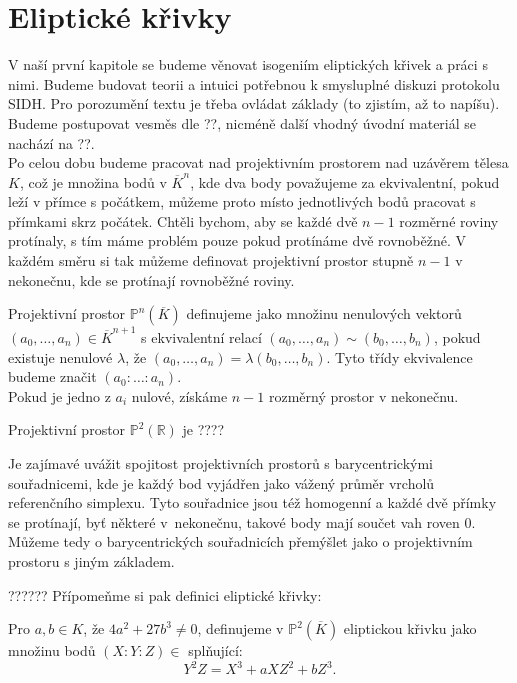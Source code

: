 \documentclass [12pt]{report}
\begin{document}
\section{Eliptické křivky}

V naší první kapitole se budeme věnovat isogeniím eliptických křivek a práci s nimi. Budeme budovat teorii a intuici potřebnou k smysluplné diskuzi protokolu SIDH. Pro porozumění textu je třeba ovládat základy (to zjistím, až to napíšu). Budeme postupovat vesměs dle ??, nicméně další vhodný úvodní materiál se nachází na ??.\\

Po celou dobu budeme pracovat nad projektivním prostorem nad uzávěrem tělesa $K$, což je množina bodů v $\overline{K}^n$, kde dva body považujeme za ekvivalentní, pokud leží v přímce s počátkem, můžeme proto místo jednotlivých bodů pracovat s přímkami skrz počátek. Chtěli bychom, aby se každé dvě $n-1$ rozměrné roviny protínaly, s tím máme problém pouze pokud protínáme dvě rovnoběžné. V každém směru si tak můžeme definovat projektivní prostor stupně $n-1$ v nekonečnu, kde se protínají rovnoběžné roviny.

\begin{definice}
Projektivní prostor $\mathbb{P}^n (\overline{K})$ definujeme jako množinu nenulových vektorů $(a_0, \dots, a_n) \in \overline{K}^{n+1}$ s ekvivalentní relací $(a_0, \dots, a_n) \sim (b_0, \dots, b_n)$, pokud existuje nenulové $\lambda$, že $(a_0, \dots, a_n) = \lambda (b_0, \dots, b_n)$. Tyto třídy ekvivalence budeme značit $(a_0 : \dots : a_n)$.\\

Pokud je jedno z $a_i$ nulové, získáme $n-1$ rozměrný prostor v nekonečnu.
\end{definice}

Projektivní prostor $\mathbb{P}^2 (\mathbb{R})$ je ????

\begin{poznamka}
Je zajímavé uvážit spojitost projektivních prostorů s barycentrickými souřadnicemi, kde je každý bod vyjádřen jako vážený průměr vrcholů referenčního simplexu. Tyto souřadnice jsou též homogenní a každé dvě přímky se protínají, byť některé v~nekonečnu, takové body mají součet vah roven $0$. Můžeme tedy o barycentrických souřadnicích přemýšlet jako o projektivním prostoru s jiným základem.
\end{poznamka}

?????? Přípomeňme si pak definici eliptické křivky:
\begin{definice}
Pro $a,b \in K$, že $4a^2 + 27 b^3 \neq 0$, definujeme v $\mathbb{P}^2 (\overline{K})$ eliptickou křivku jako množinu bodů $(X:Y:Z) \in $ splňující:
\begin{equation*}
Y^2 Z = X^3 + a X Z^2 + b Z^3. 
\end{equation*}
\end{definice}
\end{document}
